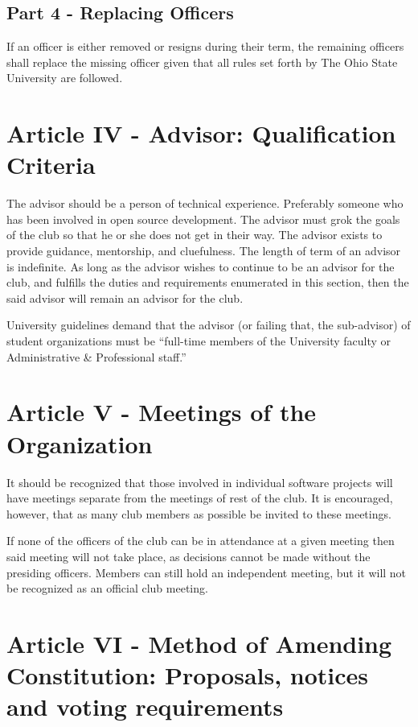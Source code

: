 \documentclass{article}
\begin{document}
	\subsection{Part 4 - Replacing Officers}

	If an officer is either removed or resigns during their term, the remaining officers shall replace the missing officer given that all rules set forth by The Ohio State University are followed.

	\section{Article IV - Advisor: Qualification Criteria}

	The advisor should be a person of technical experience. Preferably someone who has been involved in open source development. The advisor must grok the goals of the club so that he or she does not get in their way. The advisor exists to provide guidance, mentorship, and cluefulness.  The length of term of an advisor is indefinite.  As long as the advisor wishes to continue to be an advisor for the club, and fulfills the duties and requirements enumerated in this section, then the said advisor will remain an advisor for the club.

	University guidelines demand that the advisor (or failing that, the sub-advisor) of student organizations must be ``full-time members of the University faculty or Administrative \& Professional staff.''

	\section{Article V - Meetings of the Organization}

	It should be recognized that those involved in individual software projects will have meetings separate from the meetings of rest of the club. It is encouraged, however, that as many club members as possible be invited to these meetings.

	If none of the officers of the club can be in attendance at a given meeting then said meeting will not take place, as decisions cannot be made without the presiding officers. Members can still hold an independent meeting, but it will not be recognized as an official club meeting.

	\section{Article VI - Method of Amending Constitution: Proposals, notices and voting requirements}
\end{document}
